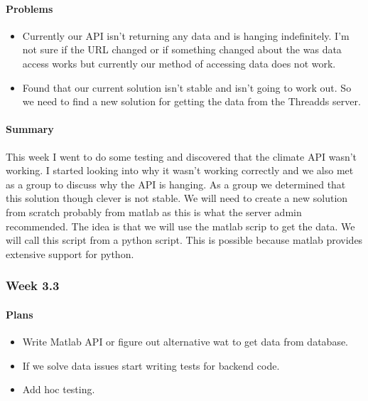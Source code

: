 \documentclass[onecolumn, draftclsnofoot,10pt, compsoc]{article}
\begin{document}
		    \paragraph{Problems} \hfill \break
		        \begin{itemize}
		            \item Currently our API isn't returning any data and is hanging indefinitely. I'm not sure if the URL changed or if something changed about the was data access works but currently our method of accessing data does not work.\\
		            \item Found that our current solution isn't stable and isn't going to work out. So we need to find a new solution for getting the data from the Threadds server.\\
		        \end{itemize}
		    \paragraph{Summary} \hfill \break
		    This week I went to do some testing and discovered that the climate API wasn't working. I started looking into why it wasn't working correctly and we also met as a group to discuss why the API is hanging. As a group we determined that this solution though clever is not stable. We will need to create a new solution from scratch probably from matlab as this is what the server admin recommended. The idea is that we will use the matlab scrip to get the data. We will call this script from a python script. This is possible because matlab provides extensive support for python.\\

		\subsubsection{Week 3.3}
		    \paragraph{Plans} \hfill \break
		        \begin{itemize}
		            \item Write Matlab API or figure out alternative wat to get data from database.\\
		            \item If we solve data issues start writing tests for backend code.\\
		            \item Add hoc testing.
		        \end{itemize}
\end{document}
